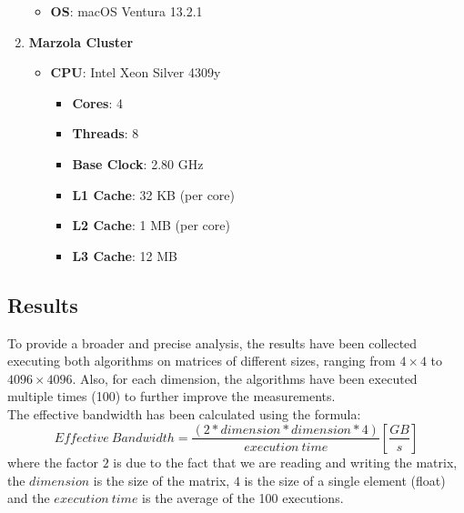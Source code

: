 \documentclass{article}
\begin{document}
\begin{enumerate}
\begin{itemize}
        \item \textbf{OS}: macOS Ventura 13.2.1
    \end{itemize}
    \item \textbf{Marzola Cluster}
    \begin{itemize}
        \item \textbf{CPU}: Intel Xeon Silver 4309y
        \begin{itemize}
            \item \textbf{Cores}: 4
            \item \textbf{Threads}: 8
            \item \textbf{Base Clock}: 2.80 GHz
            \item \textbf{L1 Cache}: 32 KB (per core)
            \item \textbf{L2 Cache}: 1 MB (per core)
            \item \textbf{L3 Cache}: 12 MB
        \end{itemize}
    \end{itemize}
\end{enumerate}
\subsection{Results}
To provide a broader and precise analysis, the results have been collected executing both algorithms on matrices of different sizes,
ranging from $4 \times 4$ to $4096 \times 4096$. Also, for each dimension, the algorithms have been executed multiple times (100) to further improve the measurements. \\
The effective bandwidth has been calculated using the formula: \\
\begin{equation*}
    Effective \: Bandwidth = \frac{\left ( 2 * dimension * dimension * 4 \right )}{execution\: time}
    \left[\frac{GB}{s}\right]
\end{equation*}
where the factor $2$ is due to the fact that we are reading and writing the matrix, the $dimension$ is the size of the matrix, 
$4$ is the size of a single element (float) and the $execution \: time$ is the average of the 100 executions. \\
\end{document}
